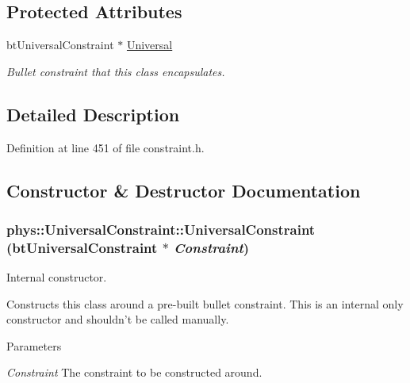 \subsection*{Protected Attributes}
\begin{DoxyCompactItemize}
\item 
\hypertarget{classphys_1_1UniversalConstraint_ac05eed2dae4f659652d5a5ecd88bacf8}{
btUniversalConstraint $\ast$ \hyperlink{classphys_1_1UniversalConstraint_ac05eed2dae4f659652d5a5ecd88bacf8}{Universal}}
\label{d0/d09/classphys_1_1UniversalConstraint_ac05eed2dae4f659652d5a5ecd88bacf8}

\begin{DoxyCompactList}\small\item\em Bullet constraint that this class encapsulates. \item\end{DoxyCompactList}\end{DoxyCompactItemize}


\subsection{Detailed Description}


Definition at line 451 of file constraint.h.



\subsection{Constructor \& Destructor Documentation}
\hypertarget{classphys_1_1UniversalConstraint_af4d0828590b7fb242f601a171aa5db5f}{
\subsubsection[{UniversalConstraint}]{\setlength{\rightskip}{0pt plus 5cm}phys::UniversalConstraint::UniversalConstraint (btUniversalConstraint $\ast$ {\em Constraint})}}
\label{d0/d09/classphys_1_1UniversalConstraint_af4d0828590b7fb242f601a171aa5db5f}


Internal constructor. 

Constructs this class around a pre-\/built bullet constraint. This is an internal only constructor and shouldn't be called manually. 
\begin{DoxyParams}{Parameters}
\item[{\em Constraint}]The constraint to be constructed around. \end{DoxyParams}


